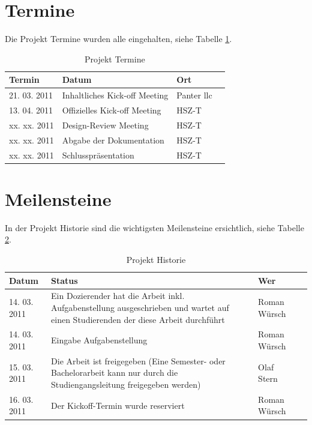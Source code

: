   \section{Termine}
  
  Die Projekt Termine wurden alle eingehalten, siehe Tabelle \ref{tab:termine}.
  \newline
  
  \begin{table}[h]
    \begin{center}
      \begin{tabular}{lp{7cm}ll}
        \toprule
        Termin & Datum & Ort \\
        \midrule
        21. 03. 2011 & Inhaltliches Kick-off Meeting & Panter llc\\
        13. 04. 2011 & Offizielles Kick-off Meeting & HSZ-T\\
        xx. xx. 2011 & Design-Review Meeting & HSZ-T\\
        xx. xx. 2011 & Abgabe der Dokumentation & HSZ-T\\
        xx. xx. 2011 & Schlusspräsentation & HSZ-T\\
        \bottomrule
      \end{tabular}
      \caption{Projekt Termine}
      \label{tab:termine}
    \end{center}
  \end{table}
  
  \section{Meilensteine}
  
  In der Projekt Historie sind die wichtigsten Meilensteine ersichtlich, siehe
  Tabelle \ref{tab:projekthistorie}.
  \newline
  
  \begin{table}[h]
    \begin{center}
      \begin{tabular}{lp{7cm}ll}
        \toprule
        Datum & Status & Wer \\
        \midrule
        14. 03. 2011 & Ein Dozierender hat die Arbeit inkl. Aufgabenstellung
        ausgeschrieben und wartet auf einen Studierenden der  diese Arbeit
        durchführt & Roman Würsch\\
        14. 03. 2011 & Eingabe Aufgabenstellung & Roman Würsch\\
        15. 03. 2011 & Die Arbeit ist freigegeben (Eine Semester- oder
        Bachelorarbeit kann nur durch die Studiengangsleitung freigegeben
        werden) & Olaf Stern\\
        16. 03. 2011 & Der Kickoff-Termin wurde reserviert & Roman Würsch\\
        \bottomrule
      \end{tabular}
      \caption{Projekt Historie}
      \label{tab:projekthistorie}
    \end{center}
  \end{table}
  

